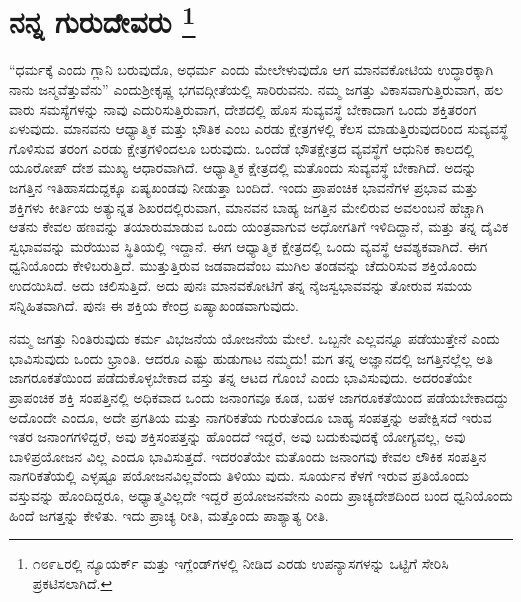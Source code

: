
\chapter[ನನ್ನ ಗುರುದೇವರು ]{ನನ್ನ ಗುರುದೇವರು \protect\footnote{೧೮೯೬ರಲ್ಲಿ ನ್ಯೂಯರ್ಕ್​ ಮತ್ತು ಇಗ್ಲೆಂಡ್​ಗಳಲ್ಲಿ ನೀಡಿದ ಎರಡು ಉಪನ್ಯಾಸಗಳನ್ನು ಒಟ್ಟಿಗೆ ಸೇರಿಸಿ ಪ್ರಕಟಿಸಲಾಗಿದೆ. }}

“ಧರ್ಮಕ್ಕೆ ಎಂದು ಗ್ಲಾನಿ ಬರುವುದೊ, ಅಧರ್ಮ ಎಂದು ಮೇಲೇಳುವುದೊ ಆಗ ಮಾನವಕೋಟಿಯ ಉದ್ಧಾರಕ್ಕಾಗಿ ನಾನು ಜನ್ಮವೆತ್ತುವೆನು” ಎಂದುಶ‍್ರೀಕೃಷ್ಣ ಭಗವದ್ಗೀತೆಯಲ್ಲಿ ಸಾರಿರುವನು. ನಮ್ಮ ಜಗತ್ತು ವಿಕಾಸವಾಗುತ್ತಿರುವಾಗ, ಹಲ ವಾರು ಸಮಸ್ಯೆಗಳನ್ನು ನಾವು ಎದುರಿಸುತ್ತಿರುವಾಗ, ದೇಶದಲ್ಲಿ ಹೊಸ ಸುವ್ಯವಸ್ಥೆ ಬೇಕಾದಾಗ ಒಂದು ಶಕ್ತಿತರಂಗ ಏಳುವುದು. ಮಾನವನು ಆಧ್ಯಾತ್ಮಿಕ ಮತ್ತು ಭೌತಿಕ ಎಂಬ ಎರಡು ಕ್ಷೇತ್ರಗಳಲ್ಲಿ ಕೆಲಸ ಮಾಡುತ್ತಿರುವುದರಿಂದ ಸುವ್ಯವಸ್ಥೆ ಗೊಳಿಸುವ ತರಂಗ ಎರಡು ಕ್ಷೇತ್ರಗಳಿಂದಲೂ ಬರುವುದು. ಒಂದೆಡೆ ಭೌತಕ್ಷೇತ್ರದ ವ್ಯವಸ್ಥೆಗೆ ಆಧುನಿಕ ಕಾಲದಲ್ಲಿ ಯೂರೋಪ್​ ದೇಶ ಮುಖ್ಯ ಆಧಾರವಾಗಿದೆ. ಆಧ್ಯಾತ್ಮಿಕ ಕ್ಷೇತ್ರದಲ್ಲಿ ಮತೊಂದು ಸುವ್ಯವಸ್ಥೆ ಬೇಕಾಗಿದೆ. ಅದನ್ನು ಜಗತ್ತಿನ ಇತಿಹಾಸದುದ್ದಕ್ಕೂ ಏಷ್ಯಖಂಡವು ನೀಡುತ್ತಾ ಬಂದಿದೆ. ಇಂದು ಪ್ರಾಪಂಚಿಕ ಭಾವನೆಗಳ ಪ್ರಭಾವ ಮತ್ತು ಶಕ್ತಿಗಳು ಕೀರ್ತಿಯ ಅತ್ಯುನ್ನತ ಶಿಖರದಲ್ಲಿರುವಾಗ, ಮಾನವನ ಬಾಹ್ಯ ಜಗತ್ತಿನ ಮೇಲಿರುವ ಅವಲಂಬನೆ ಹೆಚ್ಚಾಗಿ ಆತನು ಕೇವಲ ಹಣವನ್ನು ತಯಾರುಮಾಡುವ ಒಂದು ಯಂತ್ರವಾಗುವ ಅಧೋಗತಿಗೆ ಇಳಿದಿದ್ದಾನೆ, ಮತ್ತು ತನ್ನ ದೈವಿಕ ಸ್ವಭಾವವನ್ನು ಮರೆಯುವ ಸ್ಥಿತಿಯಲ್ಲಿ ಇದ್ದಾನೆ. ಈಗ ಆಧ್ಯಾತ್ಮಿಕ ಕ್ಷೇತ್ರದಲ್ಲಿ ಒಂದು ವ್ಯವಸ್ಥೆ ಆವಶ್ಯಕವಾಗಿದೆ. ಈಗ ಧ್ವನಿಯೊಂದು ಕೇಳಿಬರುತ್ತಿದೆ. ಮುತ್ತುತ್ತಿರುವ ಜಡವಾದವೆಂಬ ಮುಗಿಲ ತಂಡವನ್ನು ಚೆದುರಿಸುವ ಶಕ್ತಿಯೊಂದು ಉದಯಿಸಿದೆ. ಅದು ಚಲಿಸುತ್ತಿದೆ. ಅದು ಪುನಃ ಮಾನವಕೋಟಿಗೆ ತನ್ನ ನೈಜಸ್ವಭಾವವನ್ನು ತೋರುವ ಸಮಯ ಸನ್ನಿಹಿತವಾಗಿದೆ. ಪುನಃ ಈ ಶಕ್ತಿಯ ಕೇಂದ್ರ ಏಷ್ಯಾಖಂಡವಾಗುವುದು.

ನಮ್ಮ ಜಗತ್ತು ನಿಂತಿರುವುದು ಕರ್ಮ ವಿಭಜನೆಯ ಯೋಜನೆಯ ಮೇಲೆ. ಒಬ್ಬನೇ ಎಲ್ಲವನ್ನೂ ಪಡೆಯುತ್ತೇನೆ ಎಂದು ಭಾವಿಸುವುದು ಒಂದು ಭ್ರಾಂತಿ. ಆದರೂ ಎಷ್ಟು ಹುಡುಗಾಟ ನಮ್ಮದು! ಮಗ ತನ್ನ ಅಜ್ಞಾನದಲ್ಲಿ ಜಗತ್ತಿನಲ್ಲೆಲ್ಲ ಅತಿ ಜಾಗರೂಕತೆಯಿಂದ ಪಡೆದುಕೊಳ್ಳಬೇಕಾದ ವಸ್ತು ತನ್ನ ಆಟದ ಗೊಂಬೆ ಎಂದು ಭಾವಿಸುವುದು. ಅದರಂತೆಯೇ ಪ್ರಾಪಂಚಿಕ ಶಕ್ತಿ ಸಂಪತ್ತಿನಲ್ಲಿ ಅಧಿಕವಾದ ಒಂದು ಜನಾಂಗವೂ ಕೂಡ, ಬಹಳ ಜಾಗರೂಕತೆಯಿಂದ ಪಡೆಯಬೇಕಾದದ್ದು ಅದೊಂದೇ ಎಂದೂ, ಅದೇ ಪ್ರಗತಿಯ ಮತ್ತು ನಾಗರಿಕತೆಯ ಗುರುತೆಂದೂ ಬಾಹ್ಯ ಸಂಪತ್ತನ್ನು ಅಪೇಕ್ಷಿಸದೆ ಇರುವ ಇತರ ಜನಾಂಗಗಳಿದ್ದರೆ, ಅವು ಶಕ್ತಿಸಂಪತ್ತನ್ನು ಹೊಂದದೆ ಇದ್ದರೆ, ಅವು ಬದುಕುವುದಕ್ಕೆ ಯೋಗ್ಯವಲ್ಲ, ಅವು ಬಾಳಿಪ್ರಯೋಜನ ವಿಲ್ಲ ಎಂದೂ ಭಾವಿಸುತ್ತದೆ. ಇದರಂತೆಯೇ ಮತೊಂದು ಜನಾಂಗವು ಕೇವಲ ಲೌಕಿಕ ಸಂಪತ್ತಿನ ನಾಗರಿಕತೆಯಲ್ಲಿ ಎಳ್ಳಷ್ಟೂ ಪಯೋಜನವಿಲ್ಲವೆಂದು ತಿಳಿಯು ವುದು. ಸೂರ್ಯನ ಕೆಳಗೆ ಇರುವ ಪ್ರತಿಯೊಂದು ವಸ್ತುವನ್ನು ಹೊಂದಿದ್ದರೂ, ಅಧ್ಯಾತ್ಮವಿಲ್ಲದೇ ಇದ್ದರೆ ಪ್ರಯೋಜನವೇನು ಎಂದು ಪ್ರಾಚ್ಯದೇಶದಿಂದ ಬಂದ ಧ್ವನಿಯೊಂದು ಹಿಂದೆ ಜಗತ್ತನ್ನು ಕೇಳಿತು. ಇದು ಪ್ರಾಚ್ಯ ರೀತಿ, ಮತ್ತೊಂದು ಪಾಶ್ಯಾತ್ಯ ರೀತಿ.

